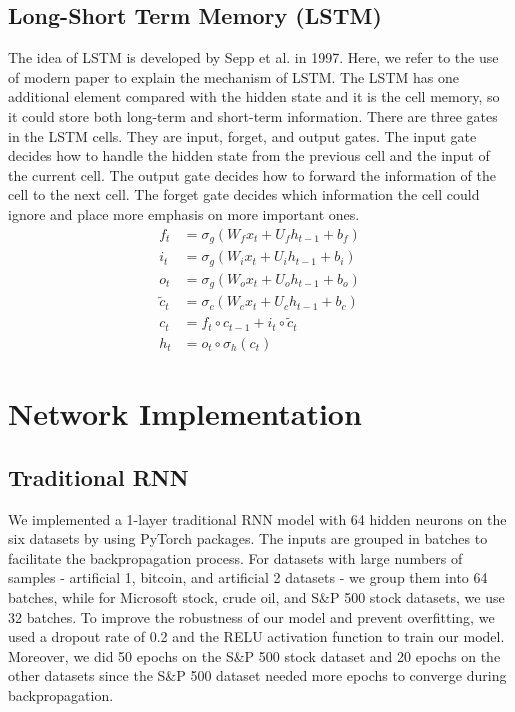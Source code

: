 \documentclass[letterpaper, 10 pt, conference]{ieeeconf}  %
\begin{document}
    \subsection{Long-Short Term Memory (LSTM)}
        The idea of LSTM is developed by Sepp et al. in 1997. Here, we refer to the use of modern paper to explain the mechanism of LSTM. The LSTM has one additional element compared with the hidden state and it is the cell memory, so it could store both long-term and short-term information. There are three gates in the LSTM cells. They are input, forget, and output gates. The input gate decides how to handle the hidden state from the previous cell and the input of the current cell. The output gate decides how to forward the information of the cell to the next cell. The forget gate decides which information the cell could ignore and place more emphasis on more important ones.
        \begin{align*}
            f_{t}&=\sigma _{g}(W_{f}x_{t}+U_{f}h_{t-1}+b_{f})\\
            i_{t}&=\sigma _{g}(W_{i}x_{t}+U_{i}h_{t-1}+b_{i})\\
            o_{t}&=\sigma _{g}(W_{o}x_{t}+U_{o}h_{t-1}+b_{o})\\
            {\tilde {c}}_{t}&=\sigma _{c}(W_{c}x_{t}+U_{c}h_{t-1}+b_{c})\\
            c_{t}&=f_{t}\circ c_{t-1}+i_{t}\circ {\tilde {c}}_{t}\\
            h_{t}&=o_{t}\circ \sigma _{h}(c_{t})
        \end{align*}


\section{Network Implementation}
    \subsection{Traditional RNN}
        We implemented a 1-layer traditional RNN model with 64 hidden neurons on the six datasets by using PyTorch packages. The inputs are grouped in batches to facilitate the backpropagation process. For datasets with large numbers of samples - artificial 1, bitcoin, and artificial 2 datasets - we group them into 64 batches, while for Microsoft stock, crude oil, and S\&P 500 stock datasets, we use 32 batches. To improve the robustness of our model and prevent overfitting, we used a dropout rate of 0.2 and the RELU activation function to train our model. Moreover, we did 50 epochs on the S\&P 500 stock dataset and 20 epochs on the other datasets since the S\&P 500 dataset needed more epochs to converge during backpropagation. 
\end{document}
